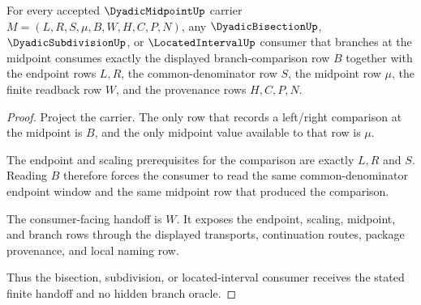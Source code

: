 \begin{theorem}
\label{thm:dyadic-midpoint-branch-comparison-handoff}
For every accepted $\DyadicMidpointUp$ carrier $M=(L,R,S,\mu,B,W,H,C,P,N)$, any $\DyadicBisectionUp$, $\DyadicSubdivisionUp$, or $\LocatedIntervalUp$ consumer that branches at the midpoint consumes exactly the displayed branch-comparison row $B$ together with the endpoint rows $L,R$, the common-denominator row $S$, the midpoint row $\mu$, the finite readback row $W$, and the provenance rows $H,C,P,N$.
\end{theorem}
\begin{proof}
Project the carrier. The only row that records a left/right comparison at the midpoint is $B$, and the only midpoint value available to that row is $\mu$.

The endpoint and scaling prerequisites for the comparison are exactly $L,R$ and $S$. Reading $B$ therefore forces the consumer to read the same common-denominator endpoint window and the same midpoint row that produced the comparison.

The consumer-facing handoff is $W$. It exposes the endpoint, scaling, midpoint, and branch rows through the displayed transports, continuation routes, package provenance, and local naming row.

Thus the bisection, subdivision, or located-interval consumer receives the stated finite handoff and no hidden branch oracle.
\end{proof}

